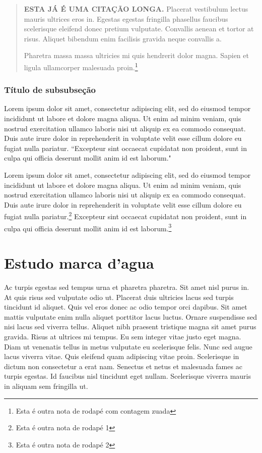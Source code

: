 \documentclass[12pt]{article}
\begin{document}
			\begin{quotation}
				\textbf{ESTA JÁ É UMA CITAÇÃO LONGA.} Placerat vestibulum lectus mauris ultrices eros in. Egestas egestas fringilla phasellus faucibus scelerisque eleifend donec pretium vulputate. Convallis aenean et tortor at risus. Aliquet bibendum enim facilisis gravida neque convallis a. 
				
				Pharetra massa massa ultricies mi quis hendrerit dolor magna. Sapien et ligula ullamcorper malesuada proin.\footnote[516]{Esta é outra nota de rodapé com contagem zuada}
			\end{quotation}
		
			\subsubsection{Título de subsubseção}
				Lorem ipsum dolor sit amet, consectetur adipiscing elit, sed do eiusmod tempor incididunt ut labore et dolore magna aliqua. Ut enim ad minim veniam, quis nostrud exercitation ullamco laboris nisi ut aliquip ex ea commodo consequat. Duis aute irure dolor in reprehenderit in voluptate velit esse cillum dolore eu fugiat nulla pariatur. ``Excepteur sint occaecat cupidatat non proident, sunt in culpa qui officia deserunt mollit anim id est laborum."
				
				Lorem ipsum dolor sit amet, consectetur adipiscing elit, sed do eiusmod tempor incididunt ut labore et dolore magna aliqua. Ut enim ad minim veniam, quis nostrud exercitation ullamco laboris nisi ut aliquip ex ea commodo consequat. Duis aute irure dolor in reprehenderit in voluptate velit esse cillum dolore eu fugiat nulla pariatur.\footnote{Esta é outra nota de rodapé 1} Excepteur sint occaecat cupidatat non proident, sunt in culpa qui officia deserunt mollit anim id est laborum.\footnote{Esta é outra nota de rodapé 2}
				
		\newpage
	\section{Estudo marca d'agua}
		
		Ac turpis egestas sed tempus urna et pharetra pharetra. Sit amet nisl purus in. At quis risus sed vulputate odio ut. Placerat duis ultricies lacus sed turpis tincidunt id aliquet. Quis vel eros donec ac odio tempor orci dapibus. Sit amet mattis vulputate enim nulla aliquet porttitor lacus luctus. Ornare suspendisse sed nisi lacus sed viverra tellus. Aliquet nibh praesent tristique magna sit amet purus gravida. Risus at ultrices mi tempus. Eu sem integer vitae justo eget magna. Diam ut venenatis tellus in metus vulputate eu scelerisque felis. Nunc sed augue lacus viverra vitae. Quis eleifend quam adipiscing vitae proin. Scelerisque in dictum non consectetur a erat nam. Senectus et netus et malesuada fames ac turpis egestas. Id faucibus nisl tincidunt eget nullam. Scelerisque viverra mauris in aliquam sem fringilla ut.
		
\end{document}
